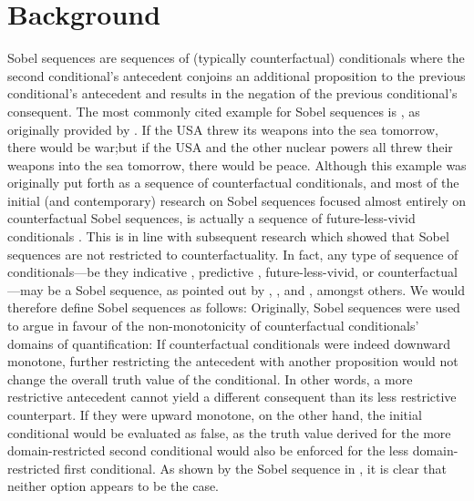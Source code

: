 \section{Background}
Sobel sequences \parencite{Lewis1973,Sobel1970} are sequences of (typically counterfactual) conditionals where the second conditional's antecedent conjoins an additional proposition to the previous conditional's antecedent and results in the negation of the previous conditional's consequent. The most commonly cited example for Sobel sequences is , as originally provided by \textcite[p. 10]{Lewis1973}.
\ex{}If the USA threw its weapons into the sea tomorrow, there would be war;\linebreak but if the USA and the other nuclear powers all threw their weapons into the sea tomorrow, there would be peace.\hfill\parencite[p. 10]{Lewis1973}
\xe
Although this example was originally put forth as a sequence of counterfactual conditionals, and most of the initial (and contemporary) research on Sobel sequences focused almost entirely on counterfactual Sobel sequences,  is actually a sequence of future-less-vivid conditionals \parencite{Iatridou2000}. This is in line with subsequent research which showed that Sobel sequences are not restricted to counterfactuality. In fact, any type of sequence of conditionals---be they indicative \parencite{Williams2008}, predictive \parencite{Moss2012,Willer2013}, future-less-vivid, or counterfactual---may be a Sobel sequence, as pointed out by \textcite{Williams2008}, \textcite{Willer2017}, and \textcite{Klecha2014,Klecha2015}, amongst others. We would therefore define Sobel sequences as follows:
\ex{}
\xe
Originally, Sobel sequences were used to argue in favour of the non-monotonicity of counterfactual conditionals' domains of quantification: If counterfactual conditionals were indeed downward monotone, further restricting the antecedent with another proposition would not change the overall truth value of the conditional. In other words, a more restrictive antecedent cannot yield a different consequent than its less restrictive counterpart. If they were upward monotone, on the other hand, the initial conditional would be evaluated as false, as the truth value derived for the more domain-restricted second conditional would also be enforced for the less domain-restricted first conditional. As shown by the Sobel sequence in , it is clear that neither option appears to be the case.

